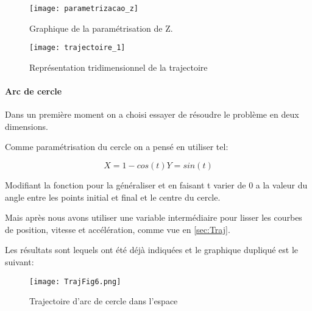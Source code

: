 \begin{figure}[H]
	\begin{center}	
		\texttt{[image: parametrizacao\_z]}
		\caption{Graphique de la paramétrisation de Z.}
		\label{fig:parametrizacao_z}
	\end{center}
\end{figure}


\begin{figure}[H]
	\begin{center}	
		\captionsetup{justification=centering,margin=1cm}
		\texttt{[image: trajectoire\_1]}
		\caption{Représentation tridimensionnel de la trajectoire}
		\label{fig:trajectoire}
	\end{center}
\end{figure}

\paragraph{Arc de cercle}

Dans un première moment on a choisi essayer de résoudre le problème  en deux dimensions.

Comme paramétrisation du cercle on a pensé en utiliser tel:

\begin{subequations}
	\begin{equation}
	X=1-cos(t)
	\end{equation}
	\begin{equation}
	Y=sin(t)
	\end{equation}
\end{subequations} 

Modifiant la fonction pour la généraliser et en faisant t varier de 0 a la valeur du angle entre les points initial et final et le centre du cercle.

Mais après nous avons utiliser une variable intermédiaire pour lisser les courbes de position, vitesse et accélération, comme vue en \ref{sec:Traj}.

Les résultats sont lequels ont été déjà indiquées et le graphique dupliqué est le suivant:


\begin{figure}[H]
	\captionsetup{justification=centering,margin=1cm}
	\texttt{[image: TrajFig6.png]}
	\caption{Trajectoire d'arc de cercle dans l'espace}
\end{figure}
